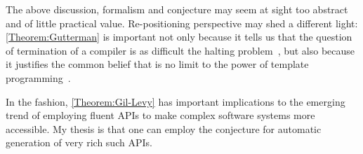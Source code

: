 The above discussion, formalism and conjecture may seem at sight too abstract
  and of little practical value.
Re-positioning perspective may shed a different light:
\cref{Theorem:Gutterman} is important not only because it tells us
  that the question of termination of a \CC compiler is as difficult
  the halting problem~\cite{Turing:1936}, but also because it
  justifies the common belief that is no limit to the power of
  template programming~\cite{Musser:Stepanov:1989,Dehnert:Stepanov:2000
  ,Backhouse:Jansson:1999, Austern:1998,Bracha:Odersky:1998,Garcia:Jarvi:2003}.

In the fashion, \cref{Theorem:Gil-Levy} has important
  implications to the emerging trend of employing fluent APIs
  to make complex software systems more accessible.
My thesis is that one can employ the conjecture for
  automatic generation of very rich such APIs.
